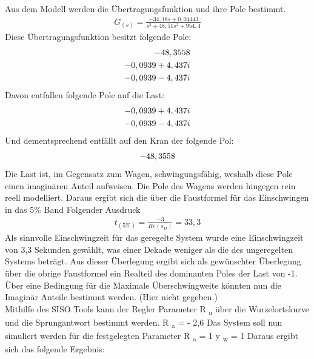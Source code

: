 \documentclass[10pt]{scrartcl}
\begin{document}
Aus dem Modell werden die Übertragungsfunktion und ihre Pole bestimmt.
\begin{align}
   G_{(s)}=\frac{-34,18s+0,04443}{s^3+48,51s^2+954,4}
\end{align}
Diese Übertragungsfunktion besitzt folgende Pole:
\begin{align}
-48,3558 \notag \\
-0,0939+4,437i  \notag \\
-0,0939-4,437i \notag 
 \end{align} 
Davon entfallen folgende Pole auf die Last: 
\begin{align}
-0,0939+4,437i  \notag \\
-0,0939-4,437i  \notag 
\end{align}
Und dementsprechend entfällt auf den Kran der folgende Pol:
\begin{align}
-48,3558  \notag 
\end{align}
Die Last ist, im Gegensatz zum Wagen, schwingungsfähig, weshalb diese Pole einen imaginären Anteil aufweisen. Die Pole des Wagens werden hingegen rein reell modelliert. 
Daraus ergibt sich die über die Faustformel für das Einschwingen in das 5\% Band Folgender Ausdruck
\begin{align}
t_{(5\%)}=\frac{-3}{Re(s_D)}=33,3
\end{align}
 Als sinnvolle Einschwingzeit für das geregelte System wurde eine Einschwingzeit von  3,3 Sekunden gewählt, was einer Dekade weniger als die des ungeregelten Systems beträgt. Aus dieser Überlegung ergibt sich als gewünschter Überlegung über die obrige Faustformel ein Realteil des dominanten Poles der Last von -1. Über eine Bedingung für die Maximale Überschwingweite könnten nun die Imaginär Anteile bestimmt werden. (Hier nicht gegeben.) \\
Mithilfe des SISO Tools kann der Regler Parameter R \textsubscript{a}
über die Wurzelortskurve und die Sprungantwort bestimmt werden.
R \textsubscript{a} = - 2,6
Das System soll nun simuliert werden für die festgelegten Parameter
R \textsubscript{a} = 1
 y \textsubscript{w} = 1
Daraus ergibt sich das folgende Ergebnis: 
\end{document}

